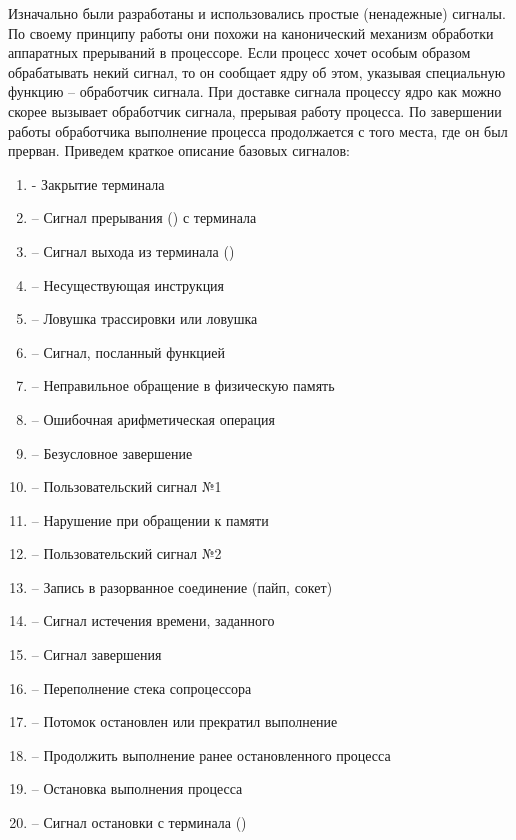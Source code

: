 Изначально были разработаны и использовались простые (ненадежные) сигналы. По своему принципу работы они похожи на канонический механизм обработки аппаратных прерываний в процессоре. Если процесс хочет особым образом обрабатывать некий сигнал, то он сообщает ядру об этом, указывая специальную функцию – обработчик сигнала. При доставке сигнала процессу ядро как можно скорее вызывает обработчик сигнала, прерывая работу процесса. По завершении работы обработчика выполнение процесса продолжается с того места, где он был прерван. Приведем краткое описание базовых сигналов:
\begin{enumerate}[itemsep=-0.2em]
	\item {} - Закрытие терминала
	\item {} -- Сигнал прерывания () с терминала
	\item {} -- Сигнал выхода из терминала (\ctrl{$\backslash$})
	\item {} -- Несуществующая инструкция
	\item {} -- Ловушка трассировки или ловушка
	\item {} -- Сигнал, посланный функцией 
	\item {} -- Неправильное обращение в физическую память
	\item {} -- Ошибочная арифметическая операция
	\item {} -- Безусловное завершение
	\item {} -- Пользовательский сигнал №1
	\item {} -- Нарушение при обращении к памяти
	\item {} -- Пользовательский сигнал №2
	\item {} -- Запись в разорванное соединение (пайп, сокет)
	\item {} -- Сигнал истечения времени, заданного 
	\item {} -- Сигнал завершения
	\item {} -- Переполнение стека сопроцессора
	\item {} -- Потомок остановлен или прекратил выполнение
	\item {} -- Продолжить выполнение ранее остановленного процесса 
	\item {} -- Остановка выполнения процесса
	\item {} -- Сигнал остановки с терминала ()

\end{enumerate}
